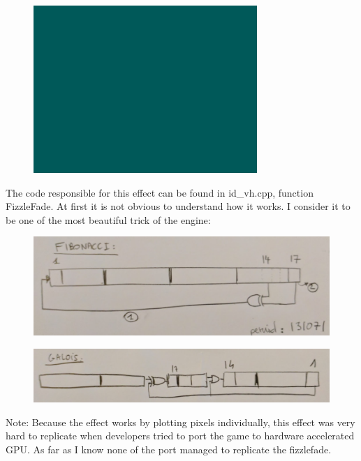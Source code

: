 \begin{figure}[H] \centering \includegraphics[scale=1.0]{imgs/fizzlefade/boss/screenshot_130.png} \end{figure}        

The code responsible for this effect can be found in id\_vh.cpp, function FizzleFade. At first it is not obvious to understand how it works. I consider it to be one of the most beautiful trick of the engine:
\newpage


        \begin{figure}[H] \centering \includegraphics[scale=0.3]{imgs/fizzlefade/fibonnaci.png} \end{figure}
    \begin{figure}[H] \centering \includegraphics[scale=0.3]{imgs/fizzlefade/galois.png} \end{figure}
      
Note: Because the effect works by plotting pixels individually, this effect was very hard to replicate when developers tried to port the game to hardware accelerated GPU. As far as I know none of the port managed to replicate the fizzlefade.

